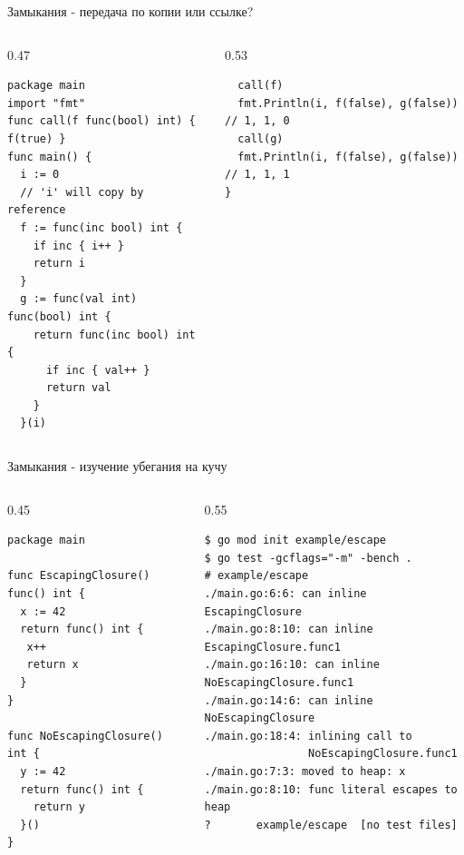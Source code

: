 \documentclass[aspectratio=169]{beamer}
\begin{document}
\begin{frame}[fragile]{Замыкания - передача по копии или ссылке?}
  \begin{columns}[T, onlytextwidth]
    \setlength{\columnsep}{0pt}
    \begin{column}{0.47\textwidth}
      \begin{verbatim}
package main
import "fmt"
func call(f func(bool) int) { f(true) }
func main() {
  i := 0
  // 'i' will copy by reference
  f := func(inc bool) int {
    if inc { i++ }
    return i
  }
  g := func(val int) func(bool) int {
    return func(inc bool) int {
      if inc { val++ }
      return val
    }
  }(i)
      \end{verbatim}
    \end{column}
    \begin{column}{0.53\textwidth}
      \begin{verbatim}
  call(f)
  fmt.Println(i, f(false), g(false)) // 1, 1, 0
  call(g)
  fmt.Println(i, f(false), g(false)) // 1, 1, 1
}
      \end{verbatim}
    \end{column}
  \end{columns}
\end{frame}


\begin{frame}[fragile]{Замыкания - изучение убегания на кучу}
  \begin{columns}[T, onlytextwidth]
    \setlength{\columnsep}{0pt}
    \begin{column}{0.45\textwidth}
      \begin{verbatim}
package main

func EscapingClosure() func() int {
  x := 42
  return func() int {
   x++
   return x
  }
}

func NoEscapingClosure() int {
  y := 42
  return func() int {
    return y
  }()
}
     \end{verbatim}
    \end{column}
    \begin{column}{0.55\textwidth}
      \begin{verbatim}
$ go mod init example/escape
$ go test -gcflags="-m" -bench .
# example/escape
./main.go:6:6: can inline EscapingClosure
./main.go:8:10: can inline EscapingClosure.func1
./main.go:16:10: can inline NoEscapingClosure.func1
./main.go:14:6: can inline NoEscapingClosure
./main.go:18:4: inlining call to
                NoEscapingClosure.func1
./main.go:7:3: moved to heap: x
./main.go:8:10: func literal escapes to heap
?   	example/escape	[no test files]
      \end{verbatim}
    \end{column}
  \end{columns}
\end{frame}
\end{document}
